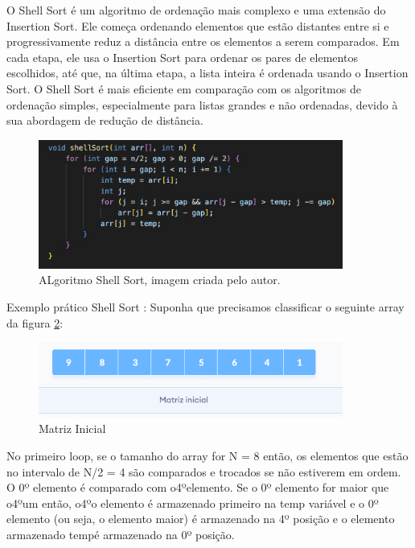 O Shell Sort é um algoritmo de ordenação mais complexo e uma extensão do Insertion Sort. Ele começa ordenando elementos que estão distantes entre si e progressivamente reduz a distância entre os elementos a serem comparados\cite{sedgewick1986shell}. Em cada etapa, ele usa o Insertion Sort para ordenar os pares de elementos escolhidos, até que, na última etapa, a lista inteira é ordenada usando o Insertion Sort. O Shell Sort é mais eficiente em comparação com os algoritmos de ordenação simples, especialmente para listas grandes e não ordenadas, devido à sua abordagem de redução de distância.

\begin{figure}[h!]
    \centering
    \includegraphics[width = 10cm]{Imagens/Shell Sort/ImagemShell.jpg}
    \caption{ALgoritmo Shell Sort, imagem criada pelo autor.}
    \label{fig:imagemshell}
\end{figure}

Exemplo prático Shell Sort \cite{siteShell}:
Suponha que precisamos classificar o seguinte array da figura \ref{fig:ex1}:
\begin{figure}[h!]
    \centering
    \includegraphics[width = 10cm]{Imagens/Shell Sort/ex1.png}
    \caption{Matriz Inicial}
    \label{fig:ex1}
\end{figure}

\par \newpage No primeiro loop, se o tamanho do array for N = 8 então, os elementos que estão no intervalo de N/2 = 4 são comparados e trocados se não estiverem em ordem.
O 0º elemento é comparado com o4ºelemento.
Se o 0º elemento for maior que o4ºum então, o4ºo elemento é armazenado primeiro na temp variável e o 0º elemento (ou seja, o elemento maior) é armazenado na 4º posição e o elemento armazenado tempé armazenado na 0º posição.

